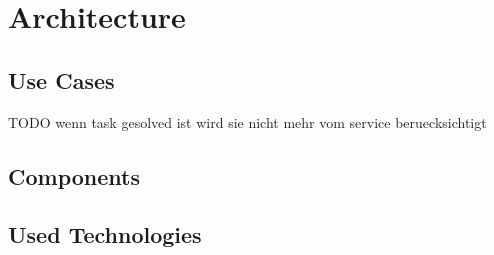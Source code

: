 \section{Architecture}
\subsection{Use Cases}
TODO wenn task gesolved ist wird sie nicht mehr vom service beruecksichtigt
\subsection{Components}
\subsection{Used Technologies}